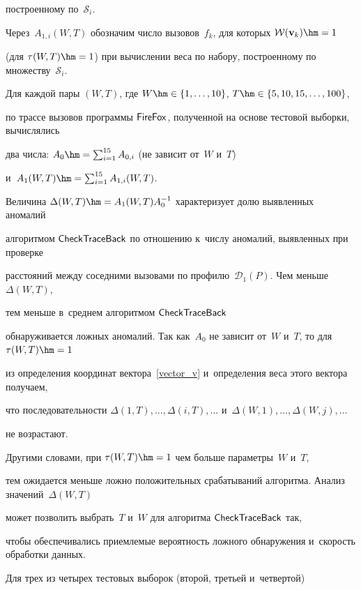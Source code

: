 построенному по~$\mathcal{S}_i$.

Через~$A_{1,i}(W,T)$ обозначим число вызовов~$f_{k}$, для которых $\mathcal{W}(\mathbf{v}_{k})\hm=1$ 

(для $\tau(W,T)\hm=1$) при вычислении веса по набору, построенному по множеству~$\mathcal{S}_i$. 

Для каждой пары $(W,T)$, где $W\hm \in\{1,\ldots,10\}$, $T\hm\in \{5,10,15,\ldots,100\}$, 

по трассе вызовов программы ${\sf FireFox}$, полученной на основе тестовой выборки, вычислялись 

два числа: $A_{0}\hm=\sum\nolimits_{i=1}^{15}A_{0,i}$ (не зависит от~$W$ и~$T$) 

и~$A_1(W,T)\hm=\sum\nolimits_{i=1}^{15}A_{1,i}(W,T)$. 

Величина $\Delta(W,T)\hm={A_1(W,T)} A^{-1}_0$ характеризует долю выявленных аномалий

 алгоритмом ${\sf CheckTraceBack}$ по отношению к~числу аномалий, выявленных при проверке 

 расстояний между соседними вызовами по профилю~$\mathcal{D}_1(P)$. Чем меньше~$\Delta(W,T)$, 

 тем меньше в~сред\-нем алгоритмом ${\sf CheckTraceBack}$ 

 обнаруживается лож\-ных аномалий. Так как~$A_0$ не зависит от~$W$ и~$T$, то для $\tau(W,T)\hm=1$ 

 из определения координат вектора~\eqref{vector_v} и~определения веса этого вектора получаем, 

 что последовательности $\Delta(1,T),\ldots ,\Delta(i,T),\ldots $ и~$\Delta(W,1),\ldots,\Delta(W,j),\ldots$ 

 не возрастают.

 

  Другими словами, при $\tau(W,T)\hm=1$ чем больше параметры~$W$ и~$T$, 

 тем ожидается меньше лож\-но положительных срабатываний алгоритма. Анализ значений~$\Delta(W,T)$ 

 может позволить выбрать~$T$ и~$W$ для алгоритма ${\sf CheckTraceBack}$ так, 

 чтобы обеспечивались приемлемые вероятность ложного обнаружения и~ско\-рость обработки данных. 

 





Для трех из четырех тестовых выборок (второй, третьей и~четвертой) 

